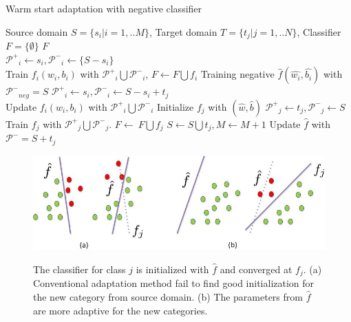 \begin{algorithm}
  \caption{Warm start adaptation with negative classifier}\label{algo:ws}
  \begin{algorithmic}[1]
    \REQUIRE Source domain $S = \{ {s_i}|i = 1,..M\} $, Target domain $T = \{ {t_j}|j = 1,..N\} $, Classifier $F = \{\emptyset\}$
    \ENSURE $F$\\
         \STATE $\mathcal{P^+}_i \leftarrow s_i, \mathcal{P^-}_i\leftarrow \{S-s_i\}$\\
          Train ${{f_i}\left( {{w_i},{b_i}} \right)}$ with $\mathcal{P^+}_i\bigcup\mathcal{P^-}_i$, $F\leftarrow F\bigcup f_i$
    \ENDFOR
    \STATE Training negative $\hat{f}\left( {\hat{w_i},\hat{b_i}} \right)$ with $\mathcal{P^-}_{neg}=S$
             \STATE $\mathcal{P^+}_i \leftarrow s_i, \mathcal{P^-}_i \leftarrow S-s_i+t_j$ \\
              Update ${{f_i}\left( {{w_i},{b_i}} \right)}$ with $\mathcal{P^+}_i\bigcup\mathcal{P^-}_i$
        \ENDFOR
        \STATE Initialize $f_j$ with $(\hat{w},\hat{b})$
        \STATE $\mathcal{P^+}_j \leftarrow t_j, \mathcal{P^-}_j\leftarrow S$
        \STATE Train $f_j$ with $\mathcal{P^+}_j\bigcup\mathcal{P^-}_j$.
        \STATE $F\leftarrow\ F\bigcup f_j$
        \STATE $S\leftarrow S\bigcup t_j, M\leftarrow M+1$
        \STATE Update $\hat{f}$ with $\mathcal{P^-}=S+t_j$
     \ENDWHILE
  \end{algorithmic}
\end{algorithm}
\begin{figure}
  \centering
  \includegraphics[scale = .6]{fig/domain.jpg}\\
  \caption{The classifier for class $j$ is initialized with $\hat{f}$ and converged at $f_j$. (a) Conventional adaptation method fail to find good initialization for the new category from source domain. (b) The parameters from $\hat{f}$ are more adaptive for the new categories.}
  \label{fig:wm}
\end{figure}

